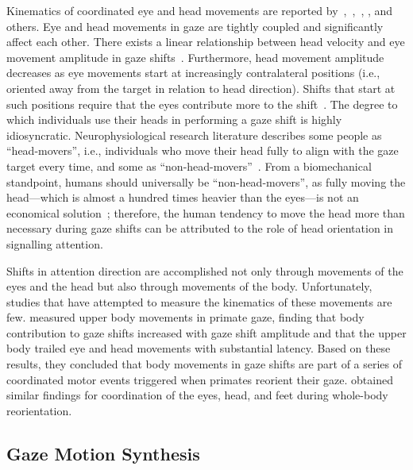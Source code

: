 Kinematics of coordinated eye and head movements are reported by~\citet{guitton1987gaze},~\citet{freedman2000coordination},~\citet{barnes1979vor}, \citet{uemura1980eyehead}, and others. Eye and head movements in gaze are tightly coupled and significantly affect each other. There exists a linear relationship between head velocity and eye movement amplitude in gaze shifts~\cite{barnes1979vor,uemura1980eyehead}. Furthermore, head movement amplitude decreases as eye movements start at increasingly contralateral positions (i.e., oriented away from the target in relation to head direction). Shifts that start at such positions require that the eyes contribute more to the shift~\cite{mccluskey2007monkeys}. The degree to which individuals use their heads in performing a gaze shift is highly idiosyncratic. Neurophysiological research literature describes some people as ``head-movers'', i.e., individuals who move their head fully to align with the gaze target every time, and some as ``non-head-movers''~\cite{fuller1992head}. From a biomechanical standpoint, humans should universally be ``non-head-movers'', as fully moving the head---which is almost a hundred times heavier than the eyes---is not an economical solution~\cite{kim2007head}; therefore, the human tendency to move the head more than necessary during gaze shifts can be attributed to the role of head orientation in signalling attention.

Shifts in attention direction are accomplished not only through movements of the eyes and the head but also through movements of the body. Unfortunately, studies that have attempted to measure the kinematics of these movements are few. \citet{mccluskey2007monkeys} measured upper body movements in primate gaze, finding that body contribution to gaze shifts increased with gaze shift amplitude and that the upper body trailed eye and head movements with substantial latency. Based on these results, they concluded that body movements in gaze shifts are part of a series of coordinated motor events triggered when primates reorient their gaze. \citet{hollands2004wholebody} obtained similar findings for coordination of the eyes, head, and feet during whole-body reorientation.

\subsection{Gaze Motion Synthesis}





